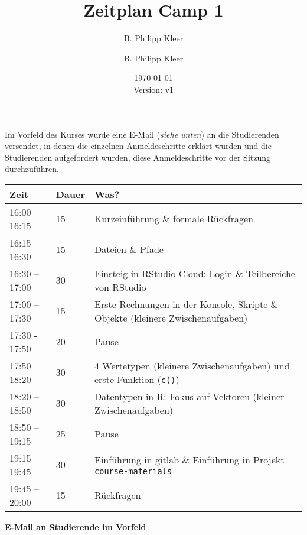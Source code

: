 \documentclass[11pt,a4paper]{article}
\author{B. Philipp Kleer}
\title{%
  Zeitplan Camp 1 \\
  }
\author{B. Philipp Kleer}
\date{\today \\ \small{Version: v1}}
\begin{document}
\maketitle

Im Vorfeld des Kurses wurde eine E-Mail (\textit{siehe unten}) an die Studierenden versendet, in denen die einzelnen Anmeldeschritte erklärt wurden und die Studierenden aufgefordert wurden, diese Anmeldeschritte vor der Sitzung durchzuführen. 

\begin{center}
	\begin{longtable}{p{} p{} p{}}
		\toprule[2pt]
		\textbf{Zeit} & \textbf{Dauer} & \textbf{Was?}\\
		\midrule
		16:00 – 16:15 & 15 & Kurzeinführung \& formale Rückfragen\\
		\midrule
		16:15 – 16:30 & 15 & Dateien \& Pfade\\
		\midrule
		16:30 – 17:00 & 30 & Einsteig in RStudio Cloud: Login \& Teilbereiche von RStudio\\
		\midrule
		17:00 – 17:30 & 15 & Erste Rechnungen in der Konsole, Skripte \& Objekte (kleinere Zwischenaufgaben)\\
		\midrule[2pt]
		17:30 - 17:50 & 20 & Pause \\
		\midrule[2pt]
		17:50 – 18:20 & 30 & 4 Wertetypen (kleinere Zwischenaufgaben) und erste Funktion (\texttt{c()})\\
		\midrule
		18:20 – 18:50 & 30 & Datentypen in R: Fokus auf Vektoren (kleiner Zwischenaufgaben)\\
		\midrule[2pt]
		18:50 – 19:15 & 25 & Pause\\
		\midrule[2pt]
		19:15 – 19:45 & 30 & Einführung in gitlab \& Einführung in Projekt \texttt{course-materials}\\
		\midrule
		19:45 – 20:00 & 15 & Rückfragen\\	
		\bottomrule[2pt]
	\end{longtable}
\end{center}
\newpage

\textbf{E-Mail an Studierende im Vorfeld}


\end{document}

